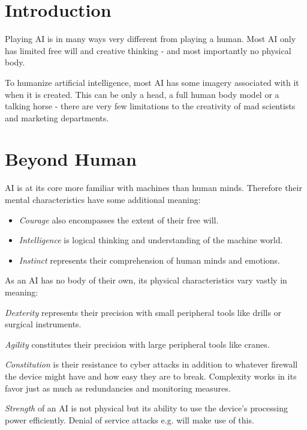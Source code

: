 \documentclass[12pt,a4paper,openany,usenames,dvipsnames]{book}
\begin{document}
	

	\chapter{Introduction}
	Playing AI is in many ways very different from playing a human. Most AI only has limited free will and creative thinking - and most importantly no physical body.
	\par
	To humanize artificial intelligence, most AI has some imagery associated with it when it is created.
	This can be only a head, a full human body model or a talking horse
		- there are very few limitations to the creativity of mad scientists and marketing departments.

	\chapter{Beyond Human}
	\vspace{-8mm} %
	AI is at its core more familiar with machines than human minds. Therefore their mental characteristics have some additional meaning:
	\vspace{-8mm}
	\begin{itemize}
		\setlength\itemsep{-8mm}
		\item \emph{Courage} also encompasses the extent of their free will.
		\item \emph{Intelligence} is logical thinking and understanding of the machine world.
		\item \emph{Instinct} represents their comprehension of human minds and emotions.
	\end{itemize}

	As an AI has no body of their own, its physical characteristics vary vastly in meaning:
	\begin{sitemize}[8]
		\item \emph{Dexterity} represents their precision with small peripheral tools like drills or surgical instruments.
		\item \emph{Agility} constitutes their precision with large peripheral tools like cranes.
		\item \emph{Constitution} is their resistance to cyber attacks in addition to whatever firewall the device might have and how easy they are to break. Complexity works in its favor just as much as redundancies and monitoring measures.
		\item \emph{Strength} of an AI is not physical but its ability to use the device’s processing power efficiently. Denial of service attacks e.g. will make use of this.
	\end{sitemize}
\end{document}
